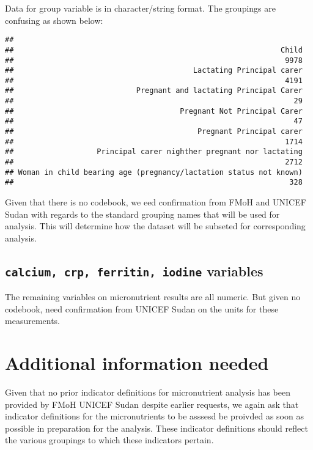 \documentclass[12pt,a4paper]{article}
\newenvironment{Shaded}{\begin{snugshade}}{\end{snugshade}}
\newcommand{\KeywordTok}[1]{\textcolor[rgb]{0.13,0.29,0.53}{\textbf{#1}}}
\newcommand{\NormalTok}[1]{#1}
\newcommand{\OperatorTok}[1]{\textcolor[rgb]{0.81,0.36,0.00}{\textbf{#1}}}
\begin{document}
Data for group variable is in character/string format. The groupings are confusing as shown below:

\begin{Shaded}
\end{Shaded}

\begin{verbatim}
## 
##                                                             Child 
##                                                              9978 
##                                         Lactating Principal carer 
##                                                              4191 
##                            Pregnant and lactating Principal Carer 
##                                                                29 
##                                      Pregnant Not Principal Carer 
##                                                                47 
##                                          Pregnant Principal carer 
##                                                              1714 
##                   Principal carer nighther pregnant nor lactating 
##                                                              2712 
## Woman in child bearing age (pregnancy/lactation status not known) 
##                                                               328
\end{verbatim}

Given that there is no codebook, we eed confirmation from FMoH and UNICEF Sudan with regards to the standard grouping names that will be used for analysis. This will determine how the dataset will be subseted for corresponding analysis.

\hypertarget{calcium-crp-ferritin-iodine-variables}{%
\subsection{\texorpdfstring{\texttt{calcium,\ crp,\ ferritin,\ iodine} variables}{calcium, crp, ferritin, iodine variables}}\label{calcium-crp-ferritin-iodine-variables}}

The remaining variables on micronutrient results are all numeric. But given no codebook, need confirmation from UNICEF Sudan on the units for these measurements.

\hypertarget{additional-information-needed}{%
\section{Additional information needed}\label{additional-information-needed}}

Given that no prior indicator definitions for micronutrient analysis has been provided by FMoH UNICEF Sudan despite earlier requests, we again ask that indicator definitions for the micronutrients to be asssesd be proivded as soon as possible in preparation for the analysis. These indicator definitions should reflect the various groupings to which these indicators pertain.


\end{document}
